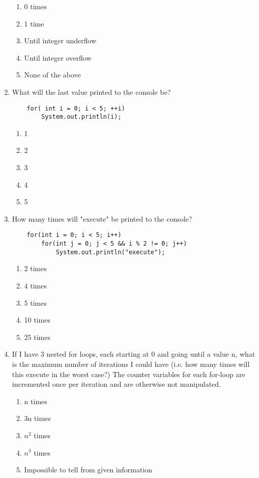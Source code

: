 \documentclass[S17-Final.tex]{subfiles}
\begin{document}
\begin{enumerate}
\begin{enumerate}
\item  0 times \ifdraft \Ans \fi 
\item  1 time
\item  Until integer underflow
\item  Until integer overflow
\item  None of the above
\end{enumerate}

\item What will the last value printed to the console be?
\begin{lstlisting}
    for( int i = 0; i < 5; ++i)
        System.out.println(i);
\end{lstlisting}
	
\begin{enumerate}
\item  1
\item  2
\item  3
\item  4 \ifdraft \Ans \fi 
\item  5
\end{enumerate}

\item How many times will "execute" be printed to the console?
\begin{lstlisting}
    for(int i = 0; i < 5; i++)
        for(int j = 0; j < 5 && i % 2 != 0; j++)
	        System.out.println("execute");
\end{lstlisting}
	
\begin{enumerate}
\item  2 times
\item  4 times
\item  5 times
\item  10 times \ifdraft \Ans \fi 
\item  25 times
\end{enumerate}

\item If I have 3 nested for loops, each starting at 0 and going until a value n, what is the maximum number of iterations I could have (i.e. how many times will this execute in the worst case?) The counter variables for each for-loop are incremented once per iteration and are otherwise not manipulated.
	
\begin{enumerate}
\item  n times
\item  3n times
\item  $n^{2}$ times
\item  $n^{3}$ times \ifdraft \Ans \fi 
\item  Impossible to tell from given information
\end{enumerate}


\end{enumerate}
\end{document}
